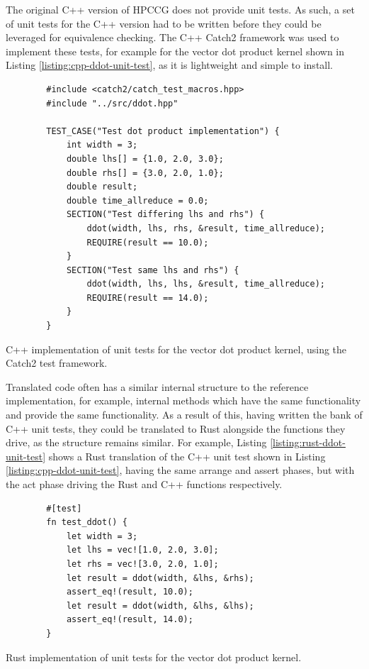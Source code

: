 The original C++ version of HPCCG does not provide unit tests. As such, a set of unit tests for the C++ version had to be written before they could be leveraged for equivalence checking. The C++ Catch2 \cite{CatchorgCatch22024} framework was used to implement these tests, for example for the vector dot product kernel shown in Listing \ref{listing:cpp-ddot-unit-test}, as it is lightweight and simple to install.

\begin{code}
    \begin{verbatim}
        #include <catch2/catch_test_macros.hpp>
        #include "../src/ddot.hpp"
        
        TEST_CASE("Test dot product implementation") {
            int width = 3;
            double lhs[] = {1.0, 2.0, 3.0};
            double rhs[] = {3.0, 2.0, 1.0};
            double result;
            double time_allreduce = 0.0;
            SECTION("Test differing lhs and rhs") {
                ddot(width, lhs, rhs, &result, time_allreduce);
                REQUIRE(result == 10.0);
            }
            SECTION("Test same lhs and rhs") {
                ddot(width, lhs, lhs, &result, time_allreduce);
                REQUIRE(result == 14.0);
            }
        }
    \end{verbatim}
    \caption{C++ implementation of unit tests for the vector dot product kernel, using the Catch2 test framework.}
    \label{listing:cpp-ddot-unit-test}
\end{code}

Translated code often has a similar internal structure to the reference implementation, for example, internal methods which have the same functionality and provide the same functionality. As a result of this, having written the bank of C++ unit tests, they could be translated to Rust alongside the functions they drive, as the structure remains similar. For example, Listing \ref{listing:rust-ddot-unit-test} shows a Rust translation of the C++ unit test shown in Listing \ref{listing:cpp-ddot-unit-test}, having the same arrange and assert phases, but with the act phase driving the Rust and C++ functions respectively.

\begin{code}[H]
    \begin{verbatim}
        #[test]
        fn test_ddot() {
            let width = 3;
            let lhs = vec![1.0, 2.0, 3.0];
            let rhs = vec![3.0, 2.0, 1.0];
            let result = ddot(width, &lhs, &rhs);
            assert_eq!(result, 10.0);
            let result = ddot(width, &lhs, &lhs);
            assert_eq!(result, 14.0);
        }
    \end{verbatim}
    \caption{Rust implementation of unit tests for the vector dot product kernel.}
    \label{listing:rust-ddot-unit-test}
\end{code}

